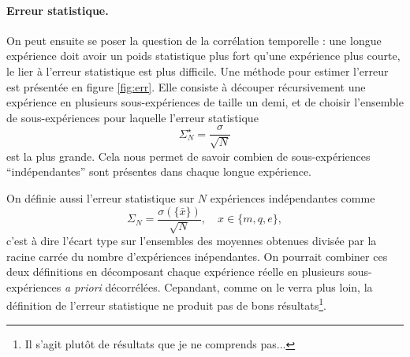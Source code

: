 \documentclass[a4paper, 11pt]{article}
\begin{document}
\paragraph{Erreur statistique.}
On peut ensuite se poser la question de la corrélation temporelle : une longue expérience doit avoir
un poids statistique plus fort qu'une expérience plus courte, le lier à l'erreur statistique est
plus difficile. Une méthode pour estimer l'erreur est présentée en figure \ref{fig:err}. Elle
consiste à découper récursivement une expérience en plusieurs sous-expériences de taille un demi, et
de choisir l'ensemble de sous-expériences pour laquelle l'erreur statistique
\begin{equation*}
    \Sigma_N^\star = \frac{\sigma}{\sqrt{N}}
\end{equation*}
est la plus grande. Cela nous permet de savoir combien de sous-expériences ``indépendantes'' sont
présentes dans chaque longue expérience.

On définie aussi l'erreur statistique sur $N$ expériences indépendantes comme 
\begin{equation*}
    \Sigma_N = \frac{\sigma( \{ \bar{x} \} )}{\sqrt{N}}, \quad x \in \{m, q, e\},
\end{equation*}
c'est à dire l'écart type sur l'ensembles des moyennes obtenues divisée par la racine carrée du
nombre d'expériences inépendantes. On pourrait combiner ces deux définitions en décomposant chaque
expérience réelle en plusieurs sous-expériences \emph{a priori} décorrélées. Cepandant, comme on le
verra plus loin, la définition de l'erreur statistique ne produit pas de bons résultats\footnote{Il
s'agit plutôt de résultats que je ne comprends pas...}.  
\end{document}
